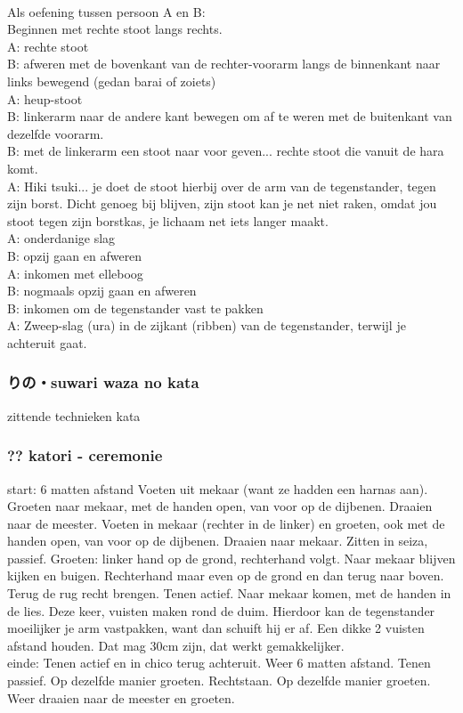 \\
Als oefening tussen persoon A en B:\\
Beginnen met rechte stoot langs rechts.\\
A: rechte stoot\\
B: afweren met de bovenkant van de rechter-voorarm langs de binnenkant naar links bewegend (gedan barai of zoiets)\\
A: heup-stoot\\
B: linkerarm naar de andere kant bewegen om af te weren met de buitenkant van dezelfde voorarm.\\
B: met de linkerarm een stoot naar voor geven... rechte stoot die vanuit de hara komt.\\
A: Hiki tsuki... je doet de stoot hierbij over de arm van de tegenstander, tegen zijn borst. Dicht genoeg bij blijven, zijn stoot kan je net niet raken, omdat jou stoot tegen zijn borstkas, je lichaam net iets langer maakt.\\
A: onderdanige slag\\
B: opzij gaan en afweren\\
A: inkomen met elleboog\\
B: nogmaals opzij gaan en afweren\\
B: inkomen om de tegenstander vast te pakken\\
A: Zweep-slag (ura) in de zijkant (ribben) van de tegenstander, terwijl je achteruit gaat.

\subsubsection{りの・suwari waza no kata}
zittende technieken kata

\subsubsection{?? katori - ceremonie}
start: 6 matten afstand
Voeten uit mekaar (want ze hadden een harnas aan).
Groeten naar mekaar, met de handen open, van voor op de dijbenen.
Draaien naar de meester.
Voeten in mekaar (rechter in de linker) en groeten, ook met de handen open, van voor op de dijbenen.
Draaien naar mekaar.
Zitten in seiza, passief.
Groeten: linker hand op de grond, rechterhand volgt.
Naar mekaar blijven kijken en buigen.
Rechterhand maar even op de grond en dan terug naar boven.
Terug de rug recht brengen.
Tenen actief.
Naar mekaar komen, met de handen in de lies. Deze keer, vuisten maken rond de duim. Hierdoor kan de tegenstander moeilijker je arm vastpakken, want dan schuift hij er af.
Een dikke 2 vuisten afstand houden. Dat mag 30cm zijn, dat werkt gemakkelijker.
\\
einde: Tenen actief en in chico terug achteruit. Weer 6 matten afstand.
Tenen passief. Op dezelfde manier groeten.
Rechtstaan.
Op dezelfde manier groeten.
Weer draaien naar de meester en groeten.

